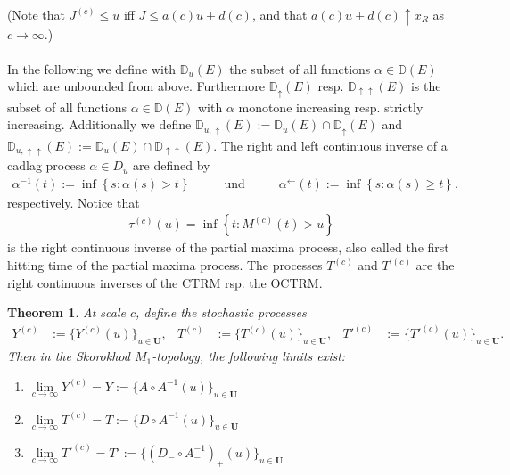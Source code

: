 \documentclass[12pt, a4paper]{article}
\newtheorem{theorem}[equation]{Theorem}
\newcommand{\1}{\mathbf 1}
\begin{document}
(Note that $J^{(c)} \le u$ iff $J \le a(c) u + d(c)$, and that 
$a(c) u + d(c) \uparrow x_R$ as $c \to \infty$.) \\
\ \\
In the following we define with $\mathbb{D}_{u}(E)$ the subset of all functions $\alpha\in \mathbb{D}(E)$  which are unbounded from above. Furthermore $\mathbb{D}_{\uparrow}(E)$ resp. $\mathbb{D}_{\uparrow\uparrow}(E)$ is the subset of all functions $\alpha\in \mathbb{D}(E)$ with $\alpha$ monotone increasing resp. strictly increasing. Additionally we define $\mathbb{D}_{u,\uparrow}(E):=\mathbb{D}_{u}(E) \cap \mathbb{D}_{\uparrow}(E)$ and $\mathbb{D}_{u,\uparrow\uparrow}(E):=\mathbb{D}_{u}(E)\cap \mathbb{D}_{\uparrow\uparrow}(E)$.
The right and left continuous inverse of a cadlag process  $\alpha \in D_{u}$ are defined by
\begin{align*}
\alpha^{-1}(t):=\inf\left\{s:\alpha(s) > t\right\} \hspace{1cm} \text{ und } \hspace{1cm} \alpha^{\leftarrow}(t):=\inf\left\{s:\alpha(s) \geq t\right\}.
\end{align*}
  respectively. Notice that   
\begin{align*}
\tau^{(c)}(u) = \inf \left\{t: M^{(c)}(t) >u \right\}
\end{align*}
is the right continuous inverse of the partial maxima process, also called the first hitting time of the partial maxima process. The processes $T^{(c)}$ and $T^{'(c)}$ are the right continuous inverses of the CTRM rsp. the OCTRM. 

\begin{theorem}
  At scale $c$, define the stochastic processes 
  \begin{align*}
    Y^{(c)} &:= \{Y^{(c)}(u)\}_{u \in \mathbf U}, 
    & T^{(c)} &:= \{T^{(c)}(u)\}_{u \in \mathbf U}, 
    & T'^{(c)} &:= \{T'^{(c)}(u)\}_{u \in \mathbf U}.
  \end{align*}
Then in the Skorokhod $M_1$-topology, the following limits exist:
  \begin{enumerate}
    \item 
    $\lim \limits_{c \to \infty} Y^{(c)} = Y := \{A \circ A^{-1}(u)\}_{u \in \mathbf U}$
    \item
    $\lim \limits_{c \to \infty} T^{(c)} = T := \{D \circ A^{-1}(u)\}_{u \in \mathbf U}$
    \item
    $\lim \limits_{c \to \infty} T'^{(c)} = T' 
    := \{(D_- \circ A^{-1}_-)_+(u)\}_{u \in \mathbf U}$
  \end{enumerate}
\end{theorem}
\end{document}
